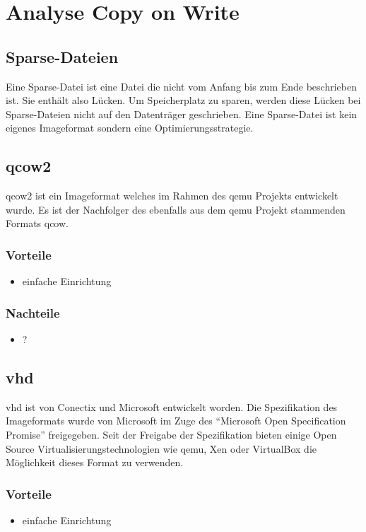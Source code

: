 \chapter{Analyse Copy on Write}
\section{Sparse-Dateien}
Eine Sparse-Datei ist eine Datei die nicht vom Anfang bis zum Ende beschrieben ist. Sie enthält also Lücken. Um Speicherplatz zu sparen, werden diese Lücken bei Sparse-Dateien nicht auf den Datenträger geschrieben. Eine Sparse-Datei ist kein eigenes Imageformat sondern eine Optimierungsstrategie. \cite{sparse}
\section{qcow2}
qcow2 ist ein Imageformat welches im Rahmen des qemu Projekts entwickelt wurde. Es ist der Nachfolger des ebenfalls aus dem qemu Projekt stammenden Formats qcow. \cite{qcowmarkmc} \cite{qemuwiki}

\subsection{Vorteile}
\begin{itemize}
 \item einfache Einrichtung
\end{itemize}

\subsection{Nachteile}
\begin{itemize}
 \item ?
\end{itemize}

\section{vhd}
vhd ist von Conectix und Microsoft entwickelt worden. Die Spezifikation des Imageformats wurde von Microsoft im Zuge des ``Microsoft Open Specification Promise'' freigegeben. Seit der Freigabe der Spezifikation bieten einige Open Source Virtualisierungstechnologien wie qemu, Xen oder VirtualBox die Möglichkeit dieses Format zu verwenden. \cite{msosp} \cite{vhdspec}

\subsection{Vorteile}
\begin{itemize}
 \item einfache Einrichtung
\end{itemize}

